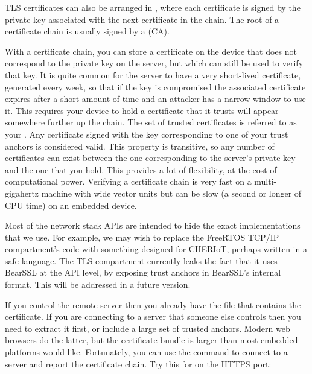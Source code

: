 {TLS certificates can also be arranged in , where each certificate is signed by the private key associated with the next certificate in the chain.
The root of a certificate chain is usually signed by a  (CA).

With a certificate chain, you can store a certificate on the device that does not correspond to the private key on the server, but which can still be used to verify that key.
It is quite common for the server to have a very short-lived certificate, generated every week, so that if the key is compromised the associated certificate expires after a short amount of time and an attacker has a narrow window to use it.
This requires your device to hold a certificate that it trusts will appear somewhere further up the chain.
The set of trusted certificates is referred to as your .
Any certificate signed with the key corresponding to one of your trust anchors is considered valid.
This property is transitive, so any number of certificates can exist between the one corresponding to the server's private key and the one that you hold.
This provides a lot of flexibility, at the cost of computational power.
Verifying a certificate chain is very fast on a multi-gigahertz machine with wide vector units but can be slow (a second or longer of CPU time) on an embedded device.

\begin{note}
Most of the network stack APIs are intended to hide the exact implementations that we use.
For example, we may wish to replace the FreeRTOS TCP/IP compartment's code with something designed for CHERIoT, perhaps written in a safe language.
The TLS compartment currently leaks the fact that it uses BearSSL at the API level, by exposing trust anchors in BearSSL's internal format.
This will be addressed in a future version.
\end{note}

If you control the remote server then you already have the  file that contains the certificate.
If you are connecting to a server that someone else controls then you need to extract it first, or include a large set of trusted anchors.
Modern web browsers do the latter, but the certificate bundle is larger than most embedded platforms would like.
Fortunately, you can use the  command to connect to a server and report the certificate chain.
Try this for  on the HTTPS port:


}
